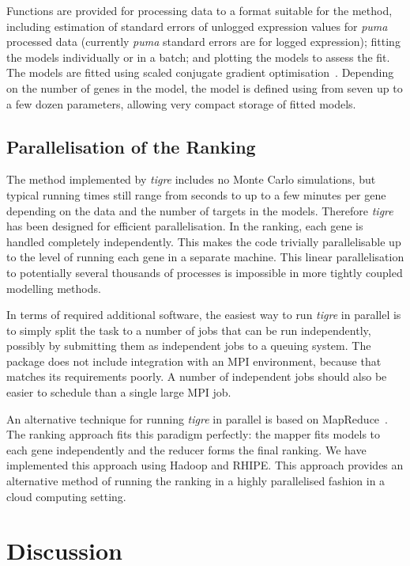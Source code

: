 \documentclass{bioinfo}
\newcommand{\tigre}{\emph{tigre}}
\begin{document}
Functions are provided for processing data to a format suitable for
the method, including estimation of standard errors of unlogged expression
values for \emph{puma} processed data (currently \emph{puma} standard errors are for logged expression); fitting the models individually
or in a batch; and plotting the models to assess the fit.  The models
are fitted using scaled conjugate gradient
optimisation~\citep{Moller:scg93}.  Depending on the number of genes
in the model, the model is defined using from seven up to a few dozen
parameters, allowing very compact storage of fitted models.

\subsection{Parallelisation of the Ranking}

The method implemented by \tigre{} includes no Monte Carlo simulations,
but typical running times still range from
seconds to up to a few minutes per gene depending on the data and the
number of targets in the models.
Therefore \tigre{} has been designed for efficient parallelisation.  In the
ranking, each gene is handled completely independently.  This makes
the code trivially parallelisable up to the level of running each gene
in a separate machine.  This linear parallelisation to potentially
several thousands of processes is impossible in more tightly coupled
modelling methods.

In terms of required additional software,
the easiest way to run \tigre{} in parallel is to simply split the
task to a number of jobs that can be run independently, possibly by
submitting them as independent jobs to a queuing system.  The package
does not include integration with an MPI environment, because that
matches its requirements poorly.  A number of independent jobs should
also be easier to schedule than a single large MPI job.

An alternative technique for running \tigre{} in parallel is based on
MapReduce~\citep{Dean2008}.  The ranking approach fits this paradigm
perfectly: the mapper fits models to each gene independently and the
reducer forms the final ranking.  We have implemented this approach
using Hadoop and RHIPE.  This approach provides an alternative method
of running the ranking in a highly parallelised fashion in a cloud
computing setting.

\section{Discussion}
\end{document}
